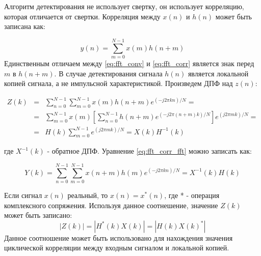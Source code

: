 Алгоритм детектирования не использует свертку, он использует корреляцию, которая отличается от свертки. Корреляция
между $x(n)$ и $h(n)$ может быть записана как:

\begin{equation}
	\label{eq:fft_corr}
	y(n) = \sum\limits_{m=0}^{N-1}{x(m)h(n+m)}
\end{equation}
Единственным отличаем между \ref{eq:fft_conv} и \ref{eq:fft_corr} является знак перед $m$ в ${h(n+m)}$.
В случае детектирования сигнала $h(n)$ является локальной копией сигнала, а не импульсной характеристикой.
Произведем ДПФ над $z(n)$:

\begin{center}
\begin{eqnarray}
	\label{eq:fft_corr_fft}
	Z(k) & = & \sum\limits_{n=0}^{N-1}\sum\limits_{m=0}^{N-1}{x(m)h(n+m)e^{(-j2\pi{kn})/N}}=\nonumber \\
	& = & \sum\limits_{m=0}^{N-1}{x(m)}[\sum\limits_{n=0}^{N-1}h(n+m)e^{(-j2\pi{(n+m)}k)/N}]e^{(j2\pi{m}k)/N}=\\
	& = & H(k)\sum\limits_{m=0}^{N-1}e^{(j2\pi{m}k)/N} = X(k)H^{-1}(k)\nonumber 
\end{eqnarray}
\end{center}
где ${X^{-1}(k)}$ - обратное ДПФ. Уравнение \ref{eq:fft_corr_fft} можно записать как:

\begin{equation}
	\label{eq:fft_corr_fft_rev}
	Y(k) = \sum\limits_{n=0}^{N-1}\sum\limits_{m=0}^{N-1}{x(n+m)h(m)e^{(-j2\pi{kn})/N}}=X^{-1}(k)H(k)
\end{equation}

Если сигнал $x(n)$ реальный, то $x(n) = x^*(n)$, где * - операция комплексного сопряжения. Используя данное соотнешение,
значение $Z(k)$ может быть записано:
\begin{equation}
	\label{eq:fft_magnitude}
	|Z(k)|=|H^*(k)X(k)|=|H(k)X(k)^*|
\end{equation}
Данное соотношение может быть использовано для нахождения значения циклической корреляции между входным сигналом и 
локальной копией.

\newpage
